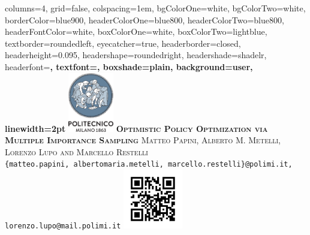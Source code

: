 \documentclass[landscape,a0paper,fontscale=0.35]{baposter}
\begin{document}
\begin{poster}%
  {
  columns=4,
  grid=false,
  colspacing=1em,
  bgColorOne=white,
  bgColorTwo=white,
  borderColor=blue900,
  headerColorOne=blue800,
  headerColorTwo=blue800,
  headerFontColor=white,
  boxColorOne=white,
  boxColorTwo=lightblue,
  textborder=roundedleft,
  eyecatcher=true,
  headerborder=closed,
  headerheight=0.095\textheight,
  headershape=roundedright,
  headershade=shadelr,
  headerfont=\large\bf\textsc, %
  textfont={\setlength{\parindent}{1.5em}},
  boxshade=plain,
  background=user,
  linewidth=2pt
  }
  {\hspace{0.5cm} \includegraphics[height=7.0em]{./pics/polilogo/logoPoliBlue_poster.png} \hspace{2cm}}
  {\bf\textsc{Optimistic Policy Optimization via Multiple Importance Sampling}\vspace{0.1em}}
  {\textsc{Matteo Papini, Alberto M. Metelli, Lorenzo Lupo and Marcello Restelli}\\ 
  {\normalsize \texttt{\{matteo.papini, albertomaria.metelli, marcello.restelli\}@polimi.it, lorenzo.lupo@mail.polimi.it}}
  }
  {%
    {\includegraphics[height=7.0em]{../talk/qr.png}}
  }


\end{poster}
\end{document}
